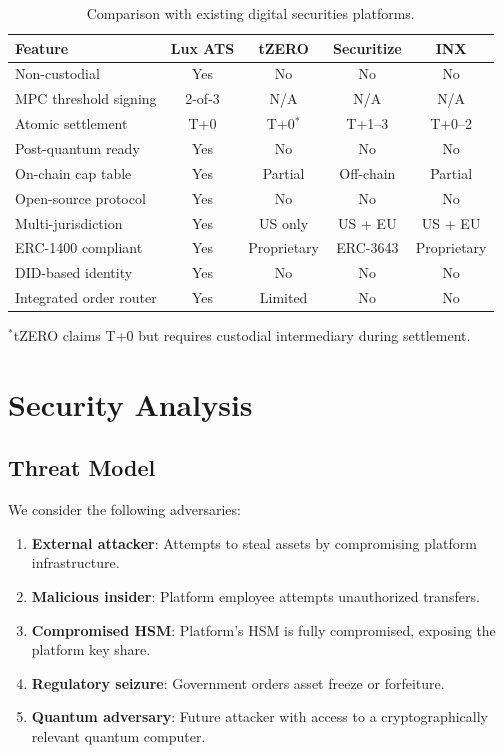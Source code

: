 \documentclass[11pt,a4paper]{article}
\begin{document}
\begin{table}[H]
\centering
\caption{Comparison with existing digital securities platforms.}
\label{tab:comparison}
\begin{tabular}{lcccc}
\toprule
\textbf{Feature} & \textbf{Lux ATS} & \textbf{tZERO} & \textbf{Securitize} & \textbf{INX} \\
\midrule
Non-custodial & Yes & No & No & No \\
MPC threshold signing & 2-of-3 & N/A & N/A & N/A \\
Atomic settlement & T+0 & T+0$^*$ & T+1--3 & T+0--2 \\
Post-quantum ready & Yes & No & No & No \\
On-chain cap table & Yes & Partial & Off-chain & Partial \\
Open-source protocol & Yes & No & No & No \\
Multi-jurisdiction & Yes & US only & US + EU & US + EU \\
ERC-1400 compliant & Yes & Proprietary & ERC-3643 & Proprietary \\
DID-based identity & Yes & No & No & No \\
Integrated order router & Yes & Limited & No & No \\
\bottomrule
\end{tabular}
\end{table}

{\footnotesize $^*$tZERO claims T+0 but requires custodial intermediary during settlement.}

\section{Security Analysis}\label{sec:security}

\subsection{Threat Model}

We consider the following adversaries:

\begin{enumerate}[nosep]
  \item \textbf{External attacker}: Attempts to steal assets by compromising platform infrastructure.
  \item \textbf{Malicious insider}: Platform employee attempts unauthorized transfers.
  \item \textbf{Compromised HSM}: Platform's HSM is fully compromised, exposing the platform key share.
  \item \textbf{Regulatory seizure}: Government orders asset freeze or forfeiture.
  \item \textbf{Quantum adversary}: Future attacker with access to a cryptographically relevant quantum computer.
\end{enumerate}
\end{document}
